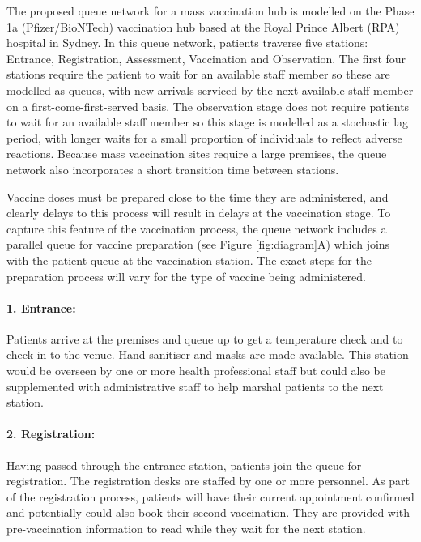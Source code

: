 \documentclass{article}
\begin{document}
The proposed queue network for a mass vaccination hub is modelled on the
Phase 1a (Pfizer/BioNTech) vaccination hub based at the Royal Prince
Albert (RPA) hospital in Sydney. In this queue network, patients
traverse five stations: Entrance, Registration, Assessment, Vaccination
and Observation. The first four stations require the patient to wait for
an available staff member so these are modelled as queues, with new
arrivals serviced by the next available staff member on a
first-come-first-served basis. The observation stage does not require
patients to wait for an available staff member so this stage is modelled
as a stochastic lag period, with longer waits for a small proportion of
individuals to reflect adverse reactions. Because mass vaccination sites
require a large premises, the queue network also incorporates a short
transition time between stations.

Vaccine doses must be prepared close to the time they are administered,
and clearly delays to this process will result in delays at the
vaccination stage. To capture this feature of the vaccination process,
the queue network includes a parallel queue for vaccine preparation (see
Figure \ref{fig:diagram}A) which joins with the patient queue at the
vaccination station. The exact steps for the preparation process will
vary for the type of vaccine being administered.

\hypertarget{entrance}{%
\paragraph{1. Entrance:}\label{entrance}}

Patients arrive at the premises and queue up to get a temperature check
and to check-in to the venue. Hand sanitiser and masks are made
available. This station would be overseen by one or more health
professional staff but could also be supplemented with administrative
staff to help marshal patients to the next station.

\hypertarget{registration}{%
\paragraph{2. Registration:}\label{registration}}

Having passed through the entrance station, patients join the queue for
registration. The registration desks are staffed by one or more
personnel. As part of the registration process, patients will have their
current appointment confirmed and potentially could also book their
second vaccination. They are provided with pre-vaccination information
to read while they wait for the next station.
\end{document}
